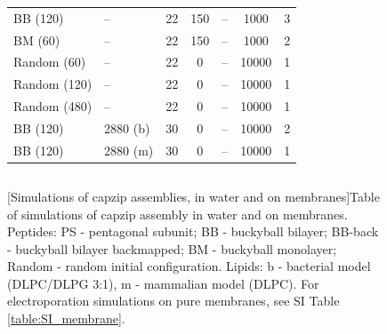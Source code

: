 \begin{figure}[p!]
\begin{tabular}{llccccc}
 BB (120) & -- & 22 & 150 & -- & 1000 & 3 \\
 BM (60) & -- & 22 & 150 & -- & 1000 & 2 \\
 Random (60) & -- & 22 & 0 & -- & 10000 & 1 \\
 Random (120) & -- & 22 & 0 & -- & 10000 & 1 \\
 Random (480) & -- & 22 & 0 & -- & 10000 & 1 \\
 BB (120) & 2880 (b) & 30 & 0 & -- & 10000 & 2 \\
 BB (120) & 2880 (m) & 30 & 0 & -- & 10000 & 1 \\
 \hline
 \end{tabular}
 \begin{tabular}{lcccccc}
 \hline
 \hline
\end{tabular}
[Simulations of capzip assemblies, in water and on membranes]{Table of simulations of capzip assembly in water and on membranes.
%
Peptides: PS - pentagonal subunit; BB - buckyball bilayer; BB-back - buckyball bilayer backmapped; BM - buckyball monolayer; Random - random initial configuration.
%
Lipids: b - bacterial model (DLPC/DLPG 3:1), m - mammalian model (DLPC).
%
%
For electroporation simulations on pure membranes, see SI Table \ref{table:SI_membrane}.}
\label{table:sim_all}
\end{figure}

